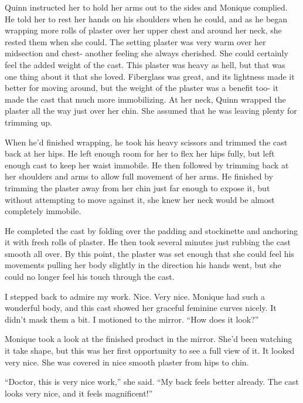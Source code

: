 \begin{thought}
Quinn instructed her to hold her arms out to the sides and Monique complied. He told her to
rest her hands on his shoulders when he could, and as he began wrapping more rolls of plaster
over her upper chest and around her neck, she rested them when she could. The setting plaster
was very warm over her midsection and chest- another feeling she always cherished. She could
certainly feel the added weight of the cast. This plaster was heavy as hell, but that was one
thing about it that she loved. Fiberglass was great, and its lightness made it better for moving
around, but the weight of the plaster was a benefit too- it made the cast that much more
immobilizing. At her neck, Quinn wrapped the plaster all the way just over her chin. She assumed
that he was leaving plenty for trimming up.

When he'd finished wrapping, he took his heavy scissors and trimmed the cast back at her
hips. He left enough room for her to flex her hips fully, but left enough cast to keep her waist
immobile. He then followed by trimming back at her shoulders and arms to allow full movement of
her arms. He finished by trimming the plaster away from her chin just far enough to expose it,
but without attempting to move against it, she knew her neck would be almost completely
immobile.

He completed the cast by folding over the padding and stockinette and anchoring it with
fresh rolls of plaster. He then took several minutes just rubbing the cast smooth all over. By
this point, the plaster was set enough that she could feel his movements pulling her body
slightly in the direction his hands went, but she could no longer feel his touch through the
cast.
\end{thought}

I stepped back to admire my work. Nice. Very nice. Monique had such a wonderful body, and
this cast showed her graceful feminine curves nicely. It didn't mask them a bit. I motioned to
the mirror. ``How does it look?''

\begin{thought}
Monique took a look at the finished product in the mirror. She'd been watching it take
shape, but this was her first opportunity to see a full view of it. It looked very nice. She was
covered in nice smooth plaster from hips to chin.
\end{thought}

``Doctor, this is very nice work,'' she said. ``My back feels better already. The cast looks
very nice, and it feels magnificent!''

